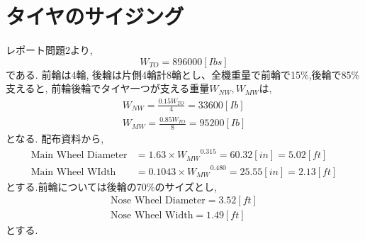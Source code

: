 \documentclass[class=article, crop=false, dvipdfmx, fleqn]{standalone}
\begin{document}
\section{タイヤのサイジング}
レポート問題2より,
\begin{equation}
  W_{TO} = 896000 [Ibs]
\end{equation}
である. 前輪は4輪, 後輪は片側4輪計8輪とし、全機重量で前輪で15$\%$,後輪で85$\%$
支えると, 前輪後輪でタイヤ一つが支える重量$W_{NW},W_{MW}$は,
\begin{align}
  W_{NW} = \frac{0.15W_{TO}}{4} = 33600 [Ib] \\
  W_{MW} = \frac{0.85W_{TO}}{8} = 95200 [Ib]
\end{align}
となる. 配布資料から,
\begin{align}
  \text{Main Wheel Diameter} &= 1.63 \times {W_{MW}}^{0.315} = 60.32[in] = 5.02[ft] \\
  \text{Main Wheel WIdth} &= 0.1043 \times {W_{MW}}^{0.480} = 25.55[in] = 2.13[ft]
\end{align}
とする.前輪については後輪の70$\%$のサイズとし,
\begin{align}
  \text{Nose Wheel Diameter} = 3.52 [ft] \\
  \text{Nose Wheel Width} = 1.49 [ft]
\end{align}
とする.
\end{document}
